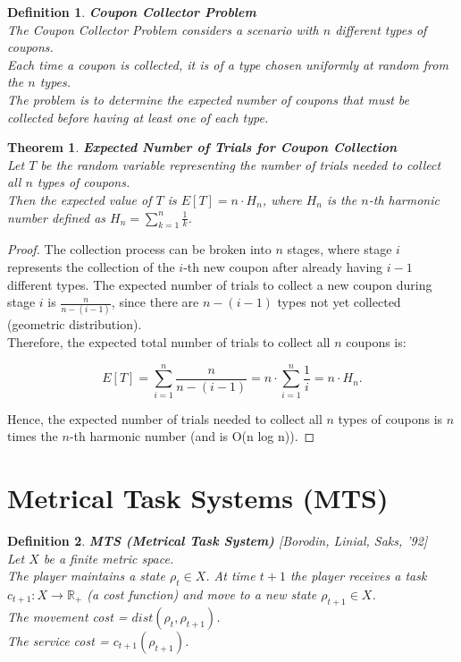 \documentclass[11pt]{book} %
\newtheorem{theorem}{Theorem}[section]
\newtheorem{definition}{Definition}[section]
\begin{document}
\begin{definition}{\textbf{Coupon Collector Problem}} \\
The \emph{Coupon Collector Problem} considers a scenario with \( n \) different types of coupons.  \\
Each time a coupon is collected, it is of a type chosen uniformly at random from the \( n \) types. \\
The problem is to determine the expected number of coupons that must be collected before having at least one of each type.
\end{definition}

\begin{theorem}{\textbf{Expected Number of Trials for Coupon Collection}} \\
Let \( T \) be the random variable representing the number of trials needed to collect all \( n \) types of coupons. \\ 
Then the expected value of \( T \) is \( E[T] = n \cdot H_n \), where \( H_n \) is the \( n \)-th harmonic number defined as \( H_n = \sum_{k=1}^{n} \frac{1}{k} \).
\end{theorem}

\begin{proof}
The collection process can be broken into \( n \) stages, where stage \( i \) represents the collection of the \( i \)-th new coupon after already
having \( i-1 \) different types. The expected number of trials to collect a new coupon during stage \( i \) is \( \frac{n}{n - (i - 1)} \), 
since there are \( n - (i - 1) \) types not yet collected (geometric distribution). \\ 
Therefore, the expected total number of trials to collect all \( n \) coupons is:

\[
E[T] = \sum_{i=1}^{n} \frac{n}{n - (i - 1)} = n \cdot \sum_{i=1}^{n} \frac{1}{i} = n \cdot H_n.
\]

Hence, the expected number of trials needed to collect all \( n \) types of coupons is \( n \) times the \( n \)-th harmonic number (and is O(n log n)).
\end{proof}


\section{Metrical Task Systems (MTS)}

\begin{definition}{\textbf{MTS (Metrical Task System)} [Borodin, Linial, Saks, '92]} \\
    Let $X$ be a finite metric space. \\
    The player maintains a state $\rho _t \in X$. 
    At time $t+1$ the player receives a task $c_{t+1} : X \to \mathbb{R}_+$ (a cost function) and move to a new state $\rho_{t+1} \in X$. \\
    The movement cost = $dist(\rho_t, \rho_{t+1})$. \\
    The service cost = $c_{t+1}(\rho_{t+1})$.
\end{definition}
\end{document}
